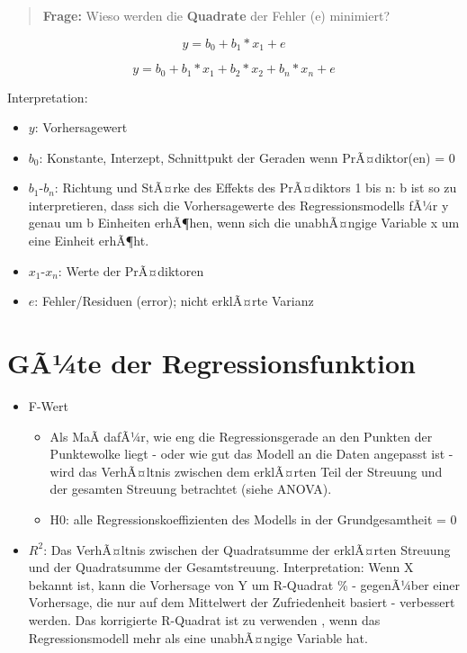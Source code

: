 \documentclass[
]{book}
\providecommand{\tightlist}{%
  \setlength{\itemsep}{0pt}\setlength{\parskip}{0pt}}
\begin{document}
\begin{quote}
\textbf{Frage:} Wieso werden die \textbf{Quadrate} der Fehler (e) minimiert?
\end{quote}

\[ y = b_{0} + b_{1}*x_{1} + e \]

\[ y = b_{0} + b_{1}*x_{1} + b_{2}*x_{2} + b_{n}*x_{n} + e \]

Interpretation:

\begin{itemize}
\tightlist
\item
  \(y\): Vorhersagewert
\item
  \(b_{0}\): Konstante, Interzept, Schnittpukt der Geraden wenn PrÃ¤diktor(en) = 0
\item
  \(b_{1}\)-\(b_{n}\): Richtung und StÃ¤rke des Effekts des PrÃ¤diktors 1 bis n: b ist so zu interpretieren, dass sich die Vorhersagewerte des Regressionsmodells fÃ¼r y genau um b Einheiten erhÃ¶hen, wenn sich die unabhÃ¤ngige Variable x um eine Einheit erhÃ¶ht.
\item
  \(x_{1}\)-\(x_{n}\): Werte der PrÃ¤diktoren
\item
  \(e\): Fehler/Residuen (error); nicht erklÃ¤rte Varianz
\end{itemize}

\hypertarget{guxe3uxbcte-der-regressionsfunktion}{%
\section{GÃ¼te der Regressionsfunktion}\label{guxe3uxbcte-der-regressionsfunktion}}

\begin{itemize}
\tightlist
\item
  F-Wert

  \begin{itemize}
  \tightlist
  \item
    Als MaÃ dafÃ¼r, wie eng die Regressionsgerade an den Punkten der Punktewolke liegt - oder wie gut das Modell an die Daten angepasst ist - wird das VerhÃ¤ltnis zwischen dem erklÃ¤rten Teil der Streuung und der gesamten Streuung betrachtet (siehe ANOVA).
  \item
    H0: alle Regressionskoeffizienten des Modells in der Grundgesamtheit = 0
  \end{itemize}
\item
  \(R^2\): Das VerhÃ¤ltnis zwischen der Quadratsumme der erklÃ¤rten Streuung und der Quadratsumme der Gesamtstreuung. Interpretation: Wenn X bekannt ist, kann die Vorhersage von Y um R-Quadrat \% - gegenÃ¼ber einer Vorhersage, die nur auf dem Mittelwert der Zufriedenheit basiert - verbessert werden. Das korrigierte R-Quadrat ist zu verwenden , wenn das Regressionsmodell mehr als eine unabhÃ¤ngige Variable hat.
\end{itemize}
\end{document}
